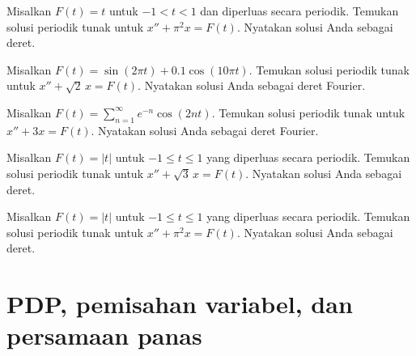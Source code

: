 \begin{exercise}
Misalkan $F(t) = t$ untuk $-1 < t < 1$ dan diperluas secara periodik.
Temukan solusi periodik tunak untuk
$x'' + \pi^2 x = F(t)$.  Nyatakan solusi Anda sebagai deret.
\end{exercise}

\setcounter{exercise}{100}

\begin{exercise}
Misalkan $F(t) = \sin(2\pi t) + 0.1 \cos(10 \pi t)$.
Temukan solusi periodik tunak untuk $x'' + \sqrt{2}\, x = F(t)$.
Nyatakan solusi Anda sebagai deret Fourier.
\end{exercise}

\begin{exercise}
Misalkan $F(t) = \sum_{n=1}^\infty e^{-n} \cos(2 n t)$.
Temukan solusi periodik tunak untuk $x'' + 3 x = F(t)$.
Nyatakan solusi Anda sebagai deret Fourier.
\end{exercise}

\begin{exercise}
Misalkan $F(t) = \lvert t \rvert$ untuk $-1 \leq t \leq 1$ yang diperluas secara periodik.
Temukan solusi periodik tunak untuk $x'' + \sqrt{3}\, x = F(t)$.
Nyatakan solusi Anda sebagai deret.
\end{exercise}

\begin{exercise}
Misalkan $F(t) = \lvert t \rvert$ untuk $-1 \leq t \leq 1$ yang diperluas secara periodik.
Temukan solusi periodik tunak untuk $x'' + \pi^2 x = F(t)$.
Nyatakan solusi Anda sebagai deret.
\end{exercise}



\sectionnewpage
\section{PDP, pemisahan variabel, dan persamaan panas}
\label{heateq:section}

